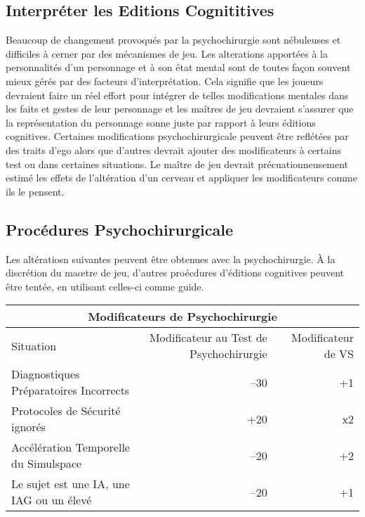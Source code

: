 \subsection{Interpréter les Editions Cognititives} Beaucoup de changement provoqués par la psychochirurgie sont nébuleuses et difficiles à cerner par des mécanismes de jeu. Les alterations apportées à la personnalités d'un personnage et à son état mental sont de toutes façon souvent mieux gérés par des facteurs d'interprétation. Cela signifie que les joueurs devraient faire un réel effort pour intégrer de telles modifications mentales dans les faits et gestes de leur personnage et les maîtres de jeu devraient s'assurer que la représentation du personnage sonne juste par rapport à leurs éditions cognitives. Certaines modifications psychochirurgicale peuvent être reflétées par des traits d'ego alors que d'autres devrait ajouter des modificateurs à certains test ou dans certaines situations. Le maître de jeu devrait précuationneusement estimé les effets de l'altération d'un cerveau et appliquer les modificateurs comme ils le pensent. 

\subsection{Procédures Psychochirurgicale} Les altératiosn suivantes peuvent être obtenues avec la psychochirurgie. À la discrétion du maœtre de jeu, d'autres proécdures d'éditions cognitives peuvent être tentée, en utilisant celles-ci comme guide. 

\begin{table} \begin{tabular}{|l|r|r|} \hline

\multicolumn{3}{|c|}{\textbf{Modificateurs de Psychochirurgie}} \\ \hline

Situation &Modificateur au Test de Psychochirurgie &Modificateur de VS\\ \hline

Diagnostiques Préparatoires Incorrects &–30 &+1 \\ \hline

Protocoles de Sécurité ignorés &+20 &x2 \\ \hline

Accélération Temporelle du Simulspace &–20 &+2 \\ \hline

Le sujet est une IA, une IAG ou un élevé &–20 &+1 \\ \hline

\end{tabular} \label{tab:psychosurgery-modifiers} \end{table} 

